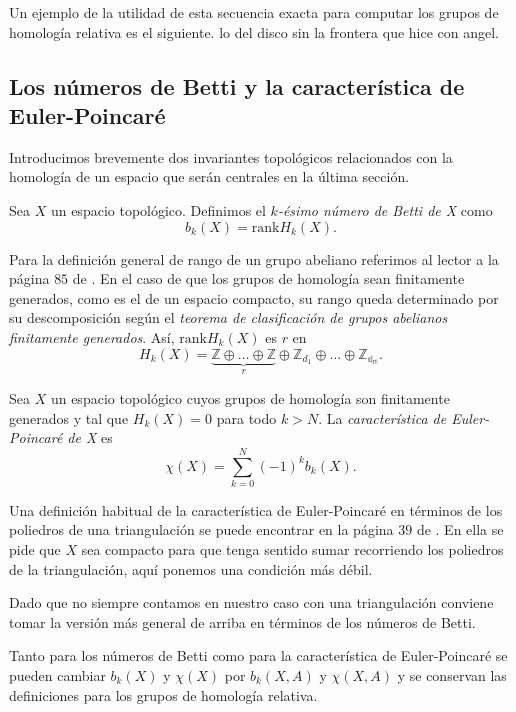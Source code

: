 Un ejemplo de la utilidad de esta secuencia exacta para computar los grupos de homología relativa es el siguiente.
{\color{red} lo del disco sin la frontera que hice con angel.}

\bigskip

\subsection{Los números de Betti y la característica de Euler-Poincaré}

Introducimos brevemente dos invariantes topológicos relacionados con la homología de un espacio que serán centrales en la última sección.

\begin{definition}
    Sea $X$ un espacio topológico. Definimos el \textit{$k$-ésimo número de Betti de X} como 
    \begin{equation*}
        b_k(X) = \text{rank} H_k(X).
    \end{equation*}
\end{definition}


Para la definición general de rango de un grupo abeliano referimos al lector a la página $85$ de \cite{FuchsInfiniteAbelianGroupsI}. En el caso de que los grupos de homología sean finitamente generados, como es el de un espacio compacto, su rango queda determinado por su descomposición según el \textit{teorema de clasificación de grupos abelianos finitamente generados}. Así, $\text{rank} H_k(X)$ es $r$ en
\begin{equation*}
    H_k(X) = \underbrace{\mathbb{Z}\oplus\dots\oplus\mathbb{Z}}_{r} \oplus \mathbb{Z}_{d_1} \oplus\dots\oplus \mathbb{Z_{d_m}}.
\end{equation*}
\bigskip

\begin{definition}
    Sea $X$ un espacio topológico cuyos grupos de homología son finitamente generados y tal que $H_k(X)=0$ para todo $k>N$. La \textit{característica de Euler-Poincaré de X} es 
    \begin{equation*}
        \chi (X) = \sum^N_{k=0} (-1)^k b_k(X).
    \end{equation*}
\end{definition}

\begin{nota}
    Una definición habitual de la característica de Euler-Poincaré en términos de los poliedros de una triangulación se puede encontrar en la página $39$ de \cite{munoz2021}. En ella se pide que $X$ sea compacto para que tenga sentido sumar recorriendo los poliedros de la triangulación, aquí ponemos una condición más débil. 
    
    Dado que no siempre contamos en nuestro caso con una triangulación conviene tomar la versión más general de arriba en términos de los números de Betti.
\end{nota}

Tanto para los números de Betti como para la característica de Euler-Poincaré se pueden cambiar $b_k(X)$ y $\chi(X)$ por $b_k(X,A)$ y $\chi(X,A)$ y se conservan las definiciones para los grupos de homología relativa.

\bigskip